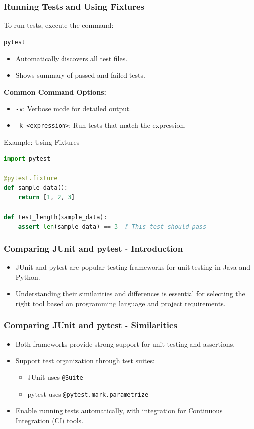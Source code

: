 \documentclass{beamer}
\begin{document}
\begin{frame}[fragile]
    \frametitle{Running Tests and Using Fixtures}
    To run tests, execute the command:
    \begin{lstlisting}[language=bash]
pytest
    \end{lstlisting}
    \begin{itemize}
        \item Automatically discovers all test files.
        \item Shows summary of passed and failed tests.
    \end{itemize}

    \textbf{Common Command Options:}
    \begin{itemize}
        \item \texttt{-v}: Verbose mode for detailed output.
        \item \texttt{-k <expression>}: Run tests that match the expression.
    \end{itemize}
    
    \begin{block}{Example: Using Fixtures}
    \begin{lstlisting}[language=Python]
import pytest

@pytest.fixture
def sample_data():
    return [1, 2, 3]

def test_length(sample_data):
    assert len(sample_data) == 3  # This test should pass
    \end{lstlisting}
    \end{block}
\end{frame}

\begin{frame}[fragile]
    \frametitle{Comparing JUnit and pytest - Introduction}
    \begin{itemize}
        \item JUnit and pytest are popular testing frameworks for unit testing in Java and Python.
        \item Understanding their similarities and differences is essential for selecting the right tool based on programming language and project requirements.
    \end{itemize}
\end{frame}

\begin{frame}[fragile]
    \frametitle{Comparing JUnit and pytest - Similarities}
    \begin{itemize}
        \item Both frameworks provide strong support for unit testing and assertions.
        \item Support test organization through test suites: 
        \begin{itemize}
            \item JUnit uses \texttt{@Suite}
            \item pytest uses \texttt{@pytest.mark.parametrize}
        \end{itemize}
        \item Enable running tests automatically, with integration for Continuous Integration (CI) tools.
    \end{itemize}
\end{frame}
\end{document}
